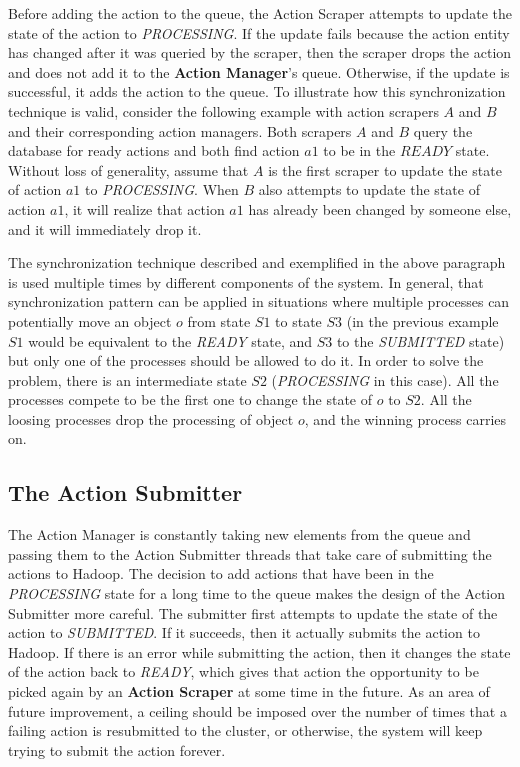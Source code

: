 Before adding the action to the queue, the Action Scraper attempts to update the state of the action to \textit{PROCESSING}. If the update fails because the action entity has changed after it was queried by the scraper, then the scraper drops the action and does not add it to the \textbf{Action Manager}'s queue. Otherwise, if the update is successful, it adds the action to the queue. To illustrate how this synchronization technique is valid, consider the following example with action scrapers $A$ and $B$ and their corresponding action managers. Both scrapers $A$ and $B$ query the database for ready actions and both find action $a1$ to be in the $READY$ state. Without loss of generality, assume that $A$ is the first scraper to update the state of action $a1$ to \textit{PROCESSING}. When $B$ also attempts to update the state of action $a1$, it will realize that action $a1$ has already been changed by someone else, and it will immediately drop it.

The synchronization technique described and exemplified in the above paragraph is used multiple times by different components of the system. In general, that synchronization pattern can be applied in situations where multiple processes can potentially move an object $o$ from state $S1$ to state $S3$ (in the previous example $S1$ would be equivalent to the \textit{READY} state, and $S3$ to the \textit{SUBMITTED} state) but only one of the processes should be allowed to do it. In order to solve the problem, there is an intermediate state $S2$ (\textit{PROCESSING} in this case).  All the processes compete to be the first one to change the state of $o$ to $S2$. All the loosing processes drop the processing of object $o$, and the winning process carries on.

\subsection{The Action Submitter}
The Action Manager is constantly taking new elements from the queue and passing them to the Action Submitter threads that take care of submitting the actions to Hadoop. The decision to add actions that have been in the \textit{PROCESSING} state for a long time to the queue makes the design of the Action Submitter more careful. The submitter first attempts to update the state of the action to \textit{SUBMITTED}. If it succeeds, then it actually submits the action to Hadoop. If there is an error while submitting the action, then it changes the state of the action back to \textit{READY}, which gives that action the opportunity to be picked again by an \textbf{Action Scraper} at some time in the future. As an area of future improvement, a ceiling should be imposed over the number of times that a failing action is resubmitted to the cluster, or otherwise, the system will keep trying to submit the action forever.

